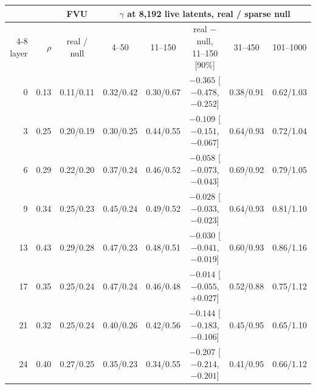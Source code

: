 \begin{tabular}{r r c cc c cc}
\toprule
 & & FVU & \multicolumn{5}{c}{$\gamma$ at 8,192 live latents, real / sparse null} \\
\cmidrule(lr){4-8}
layer & $\rho$ & real / null & 4--50 & 11--150 & real $-$ null, 11--150 [90\%] & 31--450 & 101--1000 \\
\midrule
0 & 0.13 & 0.11/0.11 & 0.32/0.42 & 0.30/0.67 & $-0.365$ [$-0.478$, $-0.252$] & 0.38/0.91 & 0.62/1.03 \\
3 & 0.25 & 0.20/0.19 & 0.30/0.25 & 0.44/0.55 & $-0.109$ [$-0.151$, $-0.067$] & 0.64/0.93 & 0.72/1.04 \\
6 & 0.29 & 0.22/0.20 & 0.37/0.24 & 0.46/0.52 & $-0.058$ [$-0.073$, $-0.043$] & 0.69/0.92 & 0.79/1.05 \\
9 & 0.34 & 0.25/0.23 & 0.45/0.24 & 0.49/0.52 & $-0.028$ [$-0.033$, $-0.023$] & 0.64/0.93 & 0.81/1.10 \\
13 & 0.43 & 0.29/0.28 & 0.47/0.23 & 0.48/0.51 & $-0.030$ [$-0.041$, $-0.019$] & 0.60/0.93 & 0.86/1.16 \\
17 & 0.35 & 0.25/0.24 & 0.47/0.24 & 0.46/0.48 & $-0.014$ [$-0.055$, $+0.027$] & 0.52/0.88 & 0.75/1.12 \\
21 & 0.32 & 0.25/0.24 & 0.40/0.26 & 0.42/0.56 & $-0.144$ [$-0.183$, $-0.106$] & 0.45/0.95 & 0.65/1.10 \\
24 & 0.40 & 0.27/0.25 & 0.35/0.23 & 0.34/0.55 & $-0.207$ [$-0.214$, $-0.201$] & 0.41/0.95 & 0.66/1.12 \\
\bottomrule
\end{tabular}
